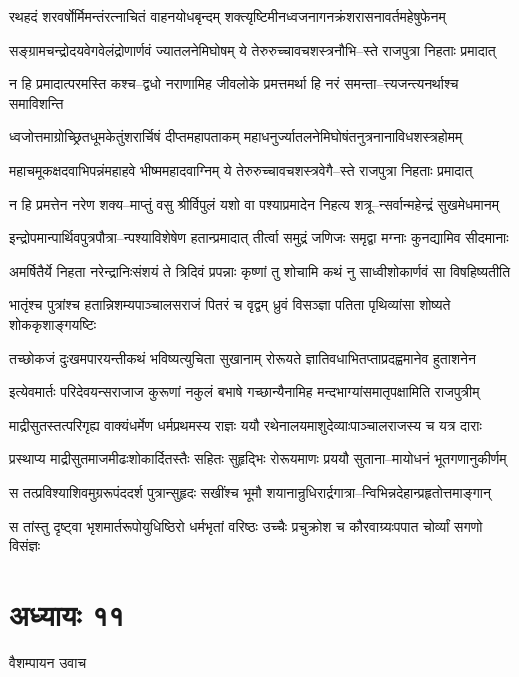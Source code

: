 \twolineshloka
{रथहदं शरवर्षोर्मिमन्तंरत्नाचितं वाहनयोधबृन्दम्}
{शक्त्यृष्टिमीनध्वजनागनक्रंशरासनावर्तमहेषुफेनम्}


\twolineshloka
{सङ्ग्रामचन्द्रोदयवेगवेलंद्रोणार्णवं ज्यातलनेमिघोषम्}
{ये तेरुरुच्चावचशस्त्रनौभि--स्ते राजपुत्रा निहताः प्रमादात्}


\twolineshloka
{न हि प्रमादात्परमस्ति कश्च--द्वधो नराणामिह जीवलोके}
{प्रमत्तमर्था हि नरं समन्ता--त्त्यजन्त्यनर्थाश्च समाविशन्ति}


\twolineshloka
{ध्वजोत्तमाग्रोच्छ्रितधूमकेतुंशरार्चिषं दीप्तमहापताकम्}
{महाधनुर्ज्यातलनेमिघोषंतनुत्रनानाविधशस्त्रहोमम्}


\twolineshloka
{महाचमूकक्षदवाभिपन्नंमहाहवे भीष्ममहादवाग्निम्}
{ये तेरुरुच्चावचशस्त्रवेगै--स्ते राजपुत्रा निहताः प्रमादात्}


\twolineshloka
{न हि प्रमत्तेन नरेण शक्य--माप्तुं वसु श्रीर्विपुलं यशो वा}
{पश्याप्रमादेन निहत्य शत्रू--न्सर्वान्महेन्द्रं सुखमेधमानम्}


\threelineshloka
{इन्द्रोपमान्पार्थिवपुत्रपौत्रा--न्पश्याविशेषेण हतान्प्रमादात्}
{तीर्त्वा समुद्रं जणिजः समृद्वा}
{मग्नाः कुनद्यामिव सीदमानाः}


\twolineshloka
{अमर्षितैर्ये निहता नरेन्द्रानिःसंशयं ते त्रिदिवं प्रपन्नाः}
{कृष्णां तु शोचामि कथं नु साध्वीशोकार्णवं सा विषहिष्यतीति}


\twolineshloka
{भातृंश्च पुत्रांश्च हतान्निशम्यपाञ्चालसराजं पितरं च वृद्वम्}
{ध्रुवं विसञ्ज्ञा पतिता पृथिव्यांसा शोष्यते शोककृशाङ्गयष्टिः}


\twolineshloka
{तच्छोकजं दुःखमपारयन्तीकथं भविष्यत्युचिता सुखानाम्}
{रोरूयते ज्ञातिवधाभितप्ताप्रदह्वमानेव हुताशनेन}


\twolineshloka
{इत्येवमार्तः परिदेवयन्सराजाज कुरूणां नकुलं बभाषे}
{गच्छान्यैनामिह मन्दभाग्यांसमातृपक्षामिति राजपुत्रीम्}


\twolineshloka
{माद्रीसुतस्तत्परिगृह्य वाक्यंधर्मेण धर्मप्रथमस्य राज्ञः}
{ययौ रथेनालयमाशुदेव्याःपाञ्चालराजस्य च यत्र दाराः}


\twolineshloka
{प्रस्थाप्य माद्रीसुतमाजमीढःशोकार्दितस्तैः सहितः सुहृद्भिः}
{रोरूयमाणः प्रययौ सुताना--मायोधनं भूतगणानुकीर्णम्}


\twolineshloka
{स तत्प्रविश्याशिवमुग्ररूपंददर्श पुत्रान्सुहृदः सखींश्च}
{भूमौ शयानान्रुधिरार्द्रगात्रा--न्विभिन्नदेहान्प्रहृतोत्तमाङ्गान्}


\twolineshloka
{स तांस्तु दृष्ट्वा भृशमार्तरूपोयुधिष्ठिरो धर्मभृतां वरिष्ठः}
{उच्चैः प्रचुक्रोश च कौरवाग्र्यःपपात चोर्व्यां सगणो विसंज्ञः}


\chapter{अध्यायः ११}
\twolineshloka
{वैशम्पायन उवाच}
{}


